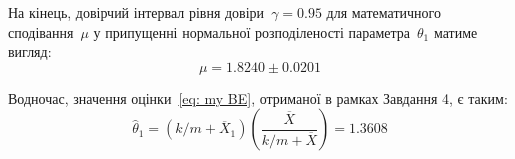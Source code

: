На кінець, довірчий інтервал рівня довіри~$\gamma=0.95$ для математичного сподівання~$\mu$ у припущенні нормальної розподіленості параметра~$\theta_1$ матиме вигляд:
\begin{equation}\label{eq: R-jags short expression of CI for theta mean}
    \mu = 1.8240 \pm 0.0201
\end{equation}

Водночас, значення оцінки~\eqref{eq: my BE}, отриманої в рамках Завдання 4, є таким:
\begin{equation}\label{eq: R-jags theta star estimation}
    \widehat{\theta}_1 = \left( k/m+\overline{X}_1 \right)\left( \frac{\overline{X}}{k/m+\overline{X}} \right) = 1.3608
\end{equation}